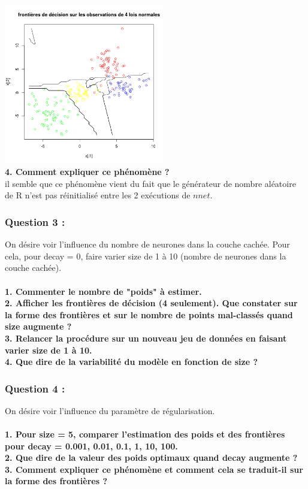 \documentclass[a4paper, 10pt]{article}
\begin{document}
\includegraphics[height = 7cm, width = 7cm]{plots/frontiere_bayes_q2_2.png}\\
\textbf{4. Comment expliquer ce phénomène ?}\\
il semble que ce phénomène vient du fait que le générateur de nombre aléatoire de R n'est pas réinitialisé entre les 2 exécutions de $nnet$.

\subsubsection*{Question 3 :}

On désire voir l'influence du nombre de neurones dans la couche cachée. Pour cela, pour decay = 0, faire varier size de 1 à 10 (nombre de neurones dans la couche cachée).\\ \\
\textbf{1. Commenter le nombre de "poids" à estimer.}\\
\textbf{2. Afficher les frontières de décision (4 seulement). Que constater sur la forme des frontières et sur le nombre de points mal-classés quand size augmente ?}\\
\textbf{3. Relancer la procédure sur un nouveau jeu de données en faisant varier size de 1 à 10.}\\
\textbf{4. Que dire de la variabilité du modèle en fonction de size ?}\\

\subsubsection*{Question 4 :}

On désire voir l'influence du paramètre de régularisation.\\ \\

\textbf{1. Pour size = 5, comparer l'estimation des poids et des frontières pour decay = 0.001, 0.01, 0.1, 1, 10, 100.}\\
\textbf{2. Que dire de la valeur des poids optimaux quand decay augmente ?}\\
\textbf{3. Comment expliquer ce phénomène et comment cela se traduit-il sur la forme des frontières ?}\\
\end{document}
